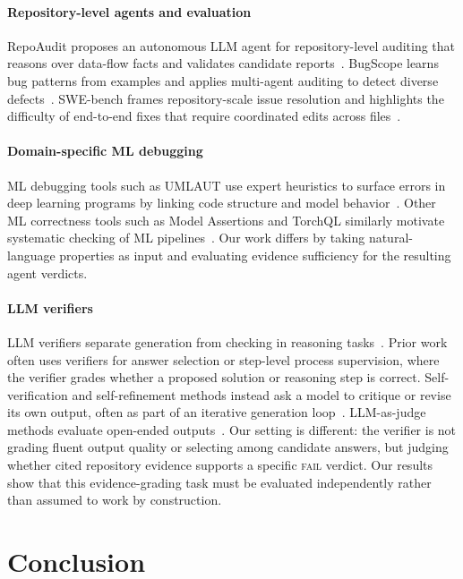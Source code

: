 \documentclass[11pt]{article}
\begin{document}
\paragraph{Repository-level agents and evaluation}
RepoAudit proposes an autonomous LLM agent for repository-level auditing that reasons over data-flow facts and validates candidate reports~\citep{guo2025repoaudit}.
BugScope learns bug patterns from examples and applies multi-agent auditing to detect diverse defects~\citep{liu2025bugscope}.
SWE-bench frames repository-scale issue resolution and highlights the difficulty of end-to-end fixes that require coordinated edits across files~\citep{jimenez2024swebench}.

\paragraph{Domain-specific ML debugging}
ML debugging tools such as UMLAUT use expert heuristics to surface errors in deep learning programs by linking code structure and model behavior~\citep{schoop2021umlaut}.
Other ML correctness tools such as Model Assertions and TorchQL similarly motivate systematic checking of ML pipelines~\citep{kang2020assertions,naik2024torchql}.
Our work differs by taking natural-language properties as input and evaluating evidence sufficiency for the resulting agent verdicts.

\paragraph{LLM verifiers}
LLM verifiers separate generation from checking in reasoning tasks~\citep{cobbe2021verifier,lightman2024process}.
Prior work often uses verifiers for answer selection or step-level process supervision, where the verifier grades whether a proposed solution or reasoning step is correct.
Self-verification and self-refinement methods instead ask a model to critique or revise its own output, often as part of an iterative generation loop~\citep{weng2023selfverification,madaan2023selfrefine}.
LLM-as-judge methods evaluate open-ended outputs~\citep{zheng2023judge,tan2025judgebench}.
Our setting is different: the verifier is not grading fluent output quality or selecting among candidate answers, but judging whether cited repository evidence supports a specific \textsc{fail} verdict.
Our results show that this evidence-grading task must be evaluated independently rather than assumed to work by construction.

\section{Conclusion}
\end{document}

